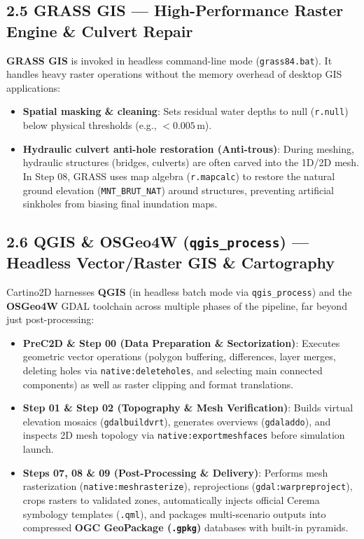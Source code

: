 \documentclass[10pt,a4paper]{article}
\begin{document}
\subsection*{2.5 GRASS GIS — High-Performance Raster Engine \& Culvert Repair}
\textbf{GRASS GIS} is invoked in headless command-line mode (\texttt{grass84.bat}). It handles heavy raster operations without the memory overhead of desktop GIS applications:
\begin{itemize}[leftmargin=1.5em, itemsep=2pt, topsep=2pt]
  \item \textbf{Spatial masking \& cleaning}: Sets residual water depths to null (\texttt{r.null}) below physical thresholds (e.g., $< 0.005\,\text{m}$).
  \item \textbf{Hydraulic culvert anti-hole restoration (Anti-trous)}: During meshing, hydraulic structures (bridges, culverts) are often carved into the 1D/2D mesh. In Step 08, GRASS uses map algebra (\texttt{r.mapcalc}) to restore the natural ground elevation (\texttt{MNT\_BRUT\_NAT}) around structures, preventing artificial sinkholes from biasing final inundation maps.
\end{itemize}

\subsection*{2.6 QGIS \& OSGeo4W (\texttt{qgis\_process}) — Headless Vector/Raster GIS \& Cartography}
Cartino2D harnesses \textbf{QGIS} (in headless batch mode via \texttt{qgis\_process}) and the \textbf{OSGeo4W} GDAL toolchain across multiple phases of the pipeline, far beyond just post-processing:
\begin{itemize}[leftmargin=1.5em, itemsep=2pt, topsep=2pt]
  \item \textbf{PreC2D \& Step 00 (Data Preparation \& Sectorization)}: Executes geometric vector operations (polygon buffering, differences, layer merges, deleting holes via \texttt{native:deleteholes}, and selecting main connected components) as well as raster clipping and format translations.
  \item \textbf{Step 01 \& Step 02 (Topography \& Mesh Verification)}: Builds virtual elevation mosaics (\texttt{gdalbuildvrt}), generates overviews (\texttt{gdaladdo}), and inspects 2D mesh topology via \texttt{native:exportmeshfaces} before simulation launch.
  \item \textbf{Steps 07, 08 \& 09 (Post-Processing \& Delivery)}: Performs mesh rasterization (\texttt{native:meshrasterize}), reprojections (\texttt{gdal:warpreproject}), crops rasters to validated zones, automatically injects official Cerema symbology templates (\texttt{.qml}), and packages multi-scenario outputs into compressed \textbf{OGC GeoPackage (\texttt{.gpkg})} databases with built-in pyramids.
\end{itemize}
\end{document}
